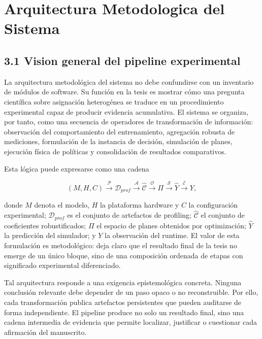 \chapter{Arquitectura Metodologica del Sistema}

\section{3.1 Vision general del pipeline experimental}
La arquitectura metodológica del sistema no debe confundirse con un inventario de módulos de software. Su función en la tesis es mostrar cómo una pregunta científica sobre asignación heterogénea se traduce en un procedimiento experimental capaz de producir evidencia acumulativa. El sistema se organiza, por tanto, como una secuencia de operadores de transformación de información: observación del comportamiento del entrenamiento, agregación robusta de mediciones, formulación de la instancia de decisión, simulación de planes, ejecución física de políticas y consolidación de resultados comparativos.

Esta lógica puede expresarse como una cadena

$$
(M,H,C) \xrightarrow{\mathcal{P}} \mathcal{D}_{prof}
\xrightarrow{\mathcal{A}} \widehat{\mathcal{C}}
\xrightarrow{\mathcal{O}} \Pi
\xrightarrow{\mathcal{S}} \widehat{Y}
\xrightarrow{\mathcal{E}} Y,
$$

donde $M$ denota el modelo, $H$ la plataforma hardware y $C$ la configuración experimental; $\mathcal{D}_{prof}$ es el conjunto de artefactos de profiling; $\widehat{\mathcal{C}}$ el conjunto de coeficientes robustificados; $\Pi$ el espacio de planes obtenidos por optimización; $\widehat{Y}$ la predicción del simulador; y $Y$ la observación del runtime. El valor de esta formulación es metodológico: deja claro que el resultado final de la tesis no emerge de un único bloque, sino de una composición ordenada de etapas con significado experimental diferenciado.

Tal arquitectura responde a una exigencia epistemológica concreta. Ninguna conclusión relevante debe depender de un paso opaco o no reconstruible. Por ello, cada transformación publica artefactos persistentes que pueden auditarse de forma independiente. El pipeline produce no solo un resultado final, sino una cadena intermedia de evidencia que permite localizar, justificar o cuestionar cada afirmación del manuscrito.

